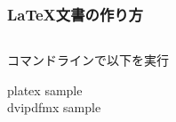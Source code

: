 \documentclass[aspectratio=149,10pt,t,]{beamer}
\begin{document}
\begin{frame}
	\frametitle{\LaTeX 文書の作り方}
	\begin{columns}[c]
		\begin{column}{0.5\textwidth}
			コマンドラインで以下を実行
			
			\begin{typecmdbox}
				platex sample\\
				dvipdfmx sample
			\end{typecmdbox}
		\end{column}
		\begin{column}{0.4\textwidth}
		\end{column}
	\end{columns}
\end{frame}
\end{document}
